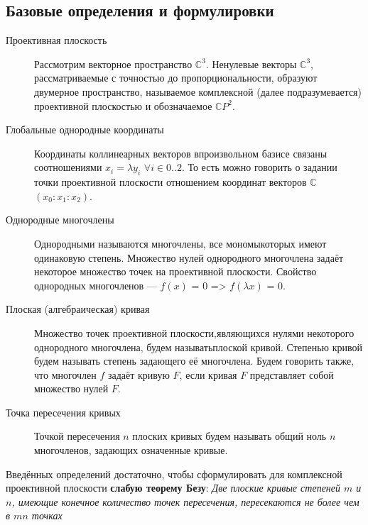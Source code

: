 \documentclass[a4paper, 12pt]{article}
\begin{document}
\subsection{Базовые определения и формулировки}
\begin{description}
\item[Проективная плоскость]
Рассмотрим векторное пространство $\mathbb{C}^3$. Ненулевые векторы $\mathbb{C}^3$, рассматриваемые с точностью до пропорциональности, образуют двумерное пространство, называемое комплексной (далее подразумевается) проективной плоскостью и обозначаемое $\mathbb{C}P^2$.
\item[Глобальные однородные координаты]
Координаты коллинеарных векторов в\newline произвольном базисе связаны соотношениями $x_i = \lambda y_i$ $\forall i \in {0..2}$. То есть можно говорить о задании точки проективной плоскости отношением координат векторов $\mathbb{C}$ $(x_0:x_1:x_2)$.
\end{description}
\begin{description}
\item[Однородные многочлены] Однородными называются многочлены, все мономы\newline которых имеют одинаковую степень. Множество нулей однородного многочлена задаёт некоторое множество точек на проективной плоскости. Свойство однородных многочленов --- $f(x)$ = $0$ => $f(\lambda x)$ = $0$.
\item[Плоская (алгебраическая) кривая]
Множество точек проективной плоскости,\newline являющихся нулями некоторого однородного многочлена, будем называть\newline плоской кривой. Степенью кривой будем называть степень задающего её многочлена. Будем говорить также, что многочлен $f$ задаёт кривую $F$, если кривая $F$ представляет собой множество нулей $F$.
\item[Точка пересечения кривых]
Точкой пересечения $n$ плоских кривых будем называть общий ноль $n$ многочленов, задающих означенные кривые.
\end{description}
Введённых определений достаточно, чтобы сформулировать для комплексной проективной плоскости \textbf{слабую теорему Безу}:
\textit{Две плоские кривые степеней $m$ и $n$, имеющие конечное количество точек пересечения, пересекаются не более чем в $mn$ точках}
\end{document}
